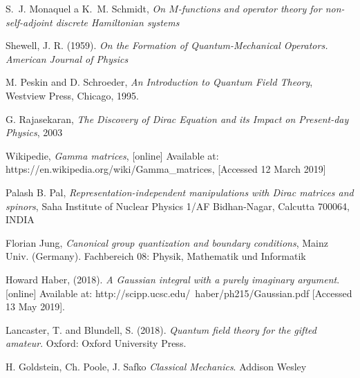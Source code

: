 \begin{thebibliography}{10}

    S.~J. Monaquel a K.~M. Schmidt, \textit{On $M$-functions and operator
      theory for non-self-adjoint discrete Hamiltonian systems}

        Shewell, J. R. (1959). \textit{On the Formation of Quantum-Mechanical 
        Operators. American Journal of Physics}

        M. Peskin and D. Schroeder, \textit{An Introduction to Quantum Field Theory},
        Westview Press, Chicago, 1995.

        G. Rajasekaran, \textit{The Discovery of Dirac Equation and its Impact on Present-day Physics},
        2003

        Wikipedie, \textit{Gamma matrices},
        [online] Available at: https://en.wikipedia.org/wiki/Gamma\_matrices, [Accessed 12 March 2019]

        Palash B. Pal, \textit{Representation-independent manipulations with Dirac matrices and spinors},
        Saha Institute of Nuclear Physics 1/AF Bidhan-Nagar, Calcutta 700064, INDIA

        Florian Jung, \textit{Canonical group quantization and boundary conditions},
        Mainz Univ. (Germany). Fachbereich 08: Physik, Mathematik und Informatik

        Howard Haber, (2018). \textit{A Gaussian integral with a purely imaginary argument}. 
        [online] Available at: http://scipp.ucsc.edu/~haber/ph215/Gaussian.pdf [Accessed 13 May 2019].

        Lancaster, T. and Blundell, S. (2018). \textit{Quantum field theory for the gifted amateur}. 
        Oxford: Oxford University Press.

        H. Goldstein, Ch. Poole, J. Safko \textit{Classical Mechanics}. 
        Addison Wesley
\end{thebibliography}

\cleardoublepage
